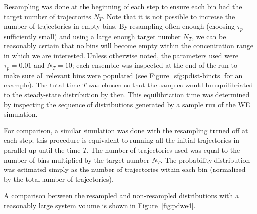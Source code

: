 \documentclass[english,letterpaper,12pt]{report}
\begin{document}
\begin{doublespacing}
Resampling was done at the beginning of each step to ensure each bin had the target number of trajectories $N_T$. Note that it is not possible to increase the number of trajectories in empty bins. By resampling often enough (choosing $\tau_p$ sufficiently small) and using a large enough target number $N_T$, we can be reasonably certain that no bins will become empty within the concentration range in which we are interested. Unless otherwise noted, the parameters used were $\tau_p = 0.01$ and $N_T = 10$; each ensemble was inspected at the end of the run to make sure all relevant bins were populated (see Figure~\ref{sfg:pdist-bincts} for an example). The total time $T$ was chosen so that the samples would be equilibriated to the steady-state distribution by then. This equilibriation time was determined by inspecting the sequence of distributions generated by a sample run of the WE simulation.

For comparison, a similar simulation was done with the resampling turned off at each step; this procedure is equivalent to running all the initial trajectories in parallel up until the time $T$. The number of trajectories used was equal to the number of bins multiplied by the target number $N_T$. The probability distribution was estimated simply as the number of trajectories within each bin (normalized by the total number of trajectories). 

A comparison between the resampled and non-resampled distributions with a reasonably large system volume is shown in Figure~\ref{fig:pdwe4}. 


\end{doublespacing}
\end{document}
